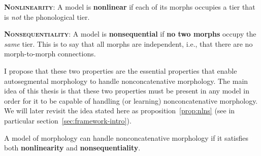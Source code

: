 	\begin{definition}\label{def:nl}{\textsc{\textbf{Nonlinearity}}}: %
	A model is \textbf{nonlinear} if each of its morphs occupies a tier that is \emph{not} the phonological tier.
	\end{definition}
	\begin{definition}\label{def:ns}{\textsc{\textbf{Nonsequentiality}}}: %
	A model is \textbf{nonsequential} if \textbf{no two morphs} occupy the \emph{same} tier. This is to say that all morphs are independent, i.e., that there are no morph-to-morph connections.
	\end{definition}
I propose that these two properties are the essential properties that enable autosegmental morphology to handle nonconcatenative morphology. The main idea of this thesis is that these two properties must be present in any model in order for it to be capable of handling (or learning) nonconcatenative morphology.  We will later revisit the idea stated here as proposition~\ref{prop:nlns} (see in particular section~\ref{sec:framework-intro}).
\begin{proposition}\label{prop:nlns}
A model of morphology can handle nonconcatenative morphology if it satisfies both \textbf{nonlinearity} and \textbf{nonsequentiality}.
\end{proposition}

